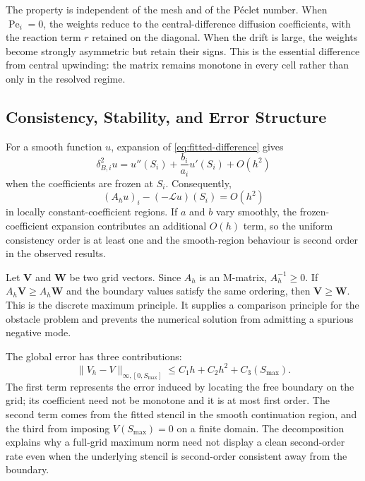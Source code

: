 \documentclass[11pt,a4paper]{article}
\theoremstyle{definition}
\theoremstyle{remark}
\begin{document}
The property is independent of the mesh and of the P\'eclet number. When
$\operatorname{Pe}_i=0$, the weights reduce to the central-difference
diffusion coefficients, with the reaction term $r$ retained on the diagonal.
When the drift is large, the weights become strongly asymmetric but retain
their signs. This is the essential difference from central upwinding: the
matrix remains monotone in every cell rather than only in the resolved
regime.

\subsection{Consistency, Stability, and Error Structure}
For a smooth function $u$, expansion of \eqref{eq:fitted-difference} gives
\begin{equation}
    \delta^2_{B,i}u
    =u''(S_i)+\frac{b_i}{a_i}u'(S_i)+O(h^2)
    \label{eq:fitted-consistency}
\end{equation}
when the coefficients are frozen at $S_i$. Consequently,
\begin{equation}
    (A_hu)_i-(-\mathcal{L}u)(S_i)=O(h^2)
    \label{eq:consistency}
\end{equation}
in locally constant-coefficient regions. If $a$ and $b$ vary smoothly, the
frozen-coefficient expansion contributes an additional $O(h)$ term, so the
uniform consistency order is at least one and the smooth-region behaviour is
second order in the observed results.

Let $\bm{V}$ and $\bm{W}$ be two grid vectors. Since $A_h$ is an M-matrix,
$A_h^{-1}\ge0$. If $A_h\bm{V}\ge A_h\bm{W}$ and the boundary values satisfy
the same ordering, then $\bm{V}\ge\bm{W}$. This is the discrete maximum
principle. It supplies a comparison principle for the obstacle problem and
prevents the numerical solution from admitting a spurious negative mode.

The global error has three contributions:
\begin{equation}
    \|V_h-V\|_{\infty,[0,S_{\max}]}
    \le C_1h+C_2h^2+C_3(S_{\max}).
    \label{eq:errorbound}
\end{equation}
The first term represents the error induced by locating the free boundary on
the grid; its coefficient need not be monotone and it is at most first order.
The second term comes from the fitted stencil in the smooth continuation
region, and the third from imposing $V(S_{\max})=0$ on a finite domain. The
decomposition explains why a full-grid maximum norm need not display a clean
second-order rate even when the underlying stencil is second-order
consistent away from the boundary.
\end{document}
